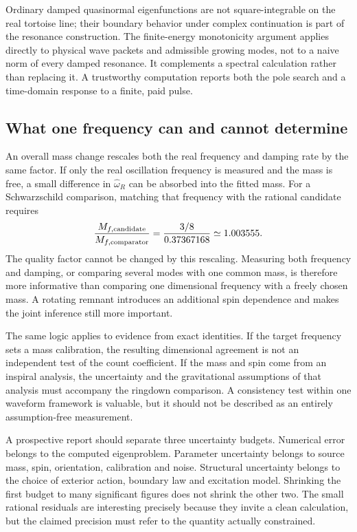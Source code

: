 Ordinary damped quasinormal eigenfunctions are not square-integrable on the real tortoise line; their boundary behavior under complex continuation is part of the resonance construction. The finite-energy monotonicity argument applies directly to physical wave packets and admissible growing modes, not to a naive norm of every damped resonance. It complements a spectral calculation rather than replacing it. A trustworthy computation reports both the pole search and a time-domain response to a finite, paid pulse.

\subsection{What one frequency can and cannot determine}
An overall mass change rescales both the real frequency and damping rate by the same factor. If only the real oscillation frequency is measured and the mass is free, a small difference in $\widehat\omega_R$ can be absorbed into the fitted mass. For a Schwarzschild comparison, matching that frequency with the rational candidate requires
\begin{equation}
 \frac{M_{f,\rm candidate}}{M_{f,\rm comparator}}
 =\frac{3/8}{0.37367168}\simeq1.003555.
 \label{c11:massdegeneracy}
\end{equation}
The quality factor cannot be changed by this rescaling. Measuring both frequency and damping, or comparing several modes with one common mass, is therefore more informative than comparing one dimensional frequency with a freely chosen mass. A rotating remnant introduces an additional spin dependence and makes the joint inference still more important.

The same logic applies to evidence from exact identities. If the target frequency sets a mass calibration, the resulting dimensional agreement is not an independent test of the count coefficient. If the mass and spin come from an inspiral analysis, the uncertainty and the gravitational assumptions of that analysis must accompany the ringdown comparison. A consistency test within one waveform framework is valuable, but it should not be described as an entirely assumption-free measurement.

A prospective report should separate three uncertainty budgets. Numerical error belongs to the computed eigenproblem. Parameter uncertainty belongs to source mass, spin, orientation, calibration and noise. Structural uncertainty belongs to the choice of exterior action, boundary law and excitation model. Shrinking the first budget to many significant figures does not shrink the other two. The small rational residuals are interesting precisely because they invite a clean calculation, but the claimed precision must refer to the quantity actually constrained.

